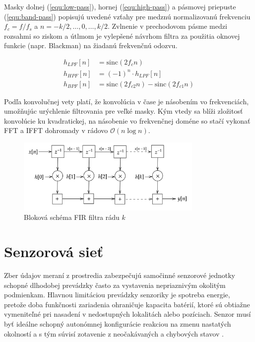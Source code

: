 Masky dolnej (\ref{equ:low-pass}), hornej (\ref{equ:high-pass}) a pásmovej priepuste (\ref{equ:band-pass}) popisujú
uvedené vzťahy pre medznú normalizovanú frekvenciu $f_c = f / f_s$ a $n = -k/2, \dots, 0, \dots, k/2$. Zvlnenie v prechodovom pásme
medzi rozsahmi so ziskom a útlmom je vylepšené návrhom filtra za použitia oknovej funkcie (napr. Blackman) na žiadanú
frekvenčnú odozvu.
\begin{ceqn}\begin{align}
h_{LPF}[n] &= \mathrm{sinc}(2 f_c n)  \label{equ:low-pass} \\
h_{HPF}[n] &= (-1)^n \cdot h_{LPF}[n] \label{equ:high-pass} \\
h_{BPF}[n] &= \mathrm{sinc}(2 f_{c2} n) -  \mathrm{sinc}(2 f_{c1} n)  \label{equ:band-pass}
\end{align}\end{ceqn}

Podľa konvolučnej vety platí, že konvolúcia v čase je násobením vo frekvenciách, umožňujúc urýchlenie filtrovania
pre veľké masky. Kým vtedy sa blíži zložitosť konvolúcie ku kvadratickej, na násobenie vo frekvenčnej doméne so
stačí vykonať FFT a IFFT dohromady v rádovo $\mathcal{O}(n \log n)$.

\begin{figure}[h]
	\centering
	\includegraphics[width=0.8\textwidth]{figures/analysis/fir-filter.png}
	\caption{Bloková schéma FIR filtra rádu $k$}
	\label{fig:fir-filter}
\end{figure}

\section{Senzorová sieť}
Zber údajov meraní z prostredia zabezpečujú samočinné senzorové jednotky schopné dlhodobej prevádzky
často za vystavenia nepriaznivým okolitým podmienkam. Hlavnou limitáciou prevádzky senzoriky je spotreba energie,
pretože doba funkčnosti zariadenia ohraničuje kapacita batérií, ktoré sú obtiažne vymeniteľné pri nasadení
v nedostupných lokalitách alebo pozíciach. Senzor musí byť ideálne schopný autonómnej konfigurácie
reakciou na zmenu nastatých okolností a s tým súvisí zotavenie z neočakávaných a chybových stavov \cite{wsn-overview}.

